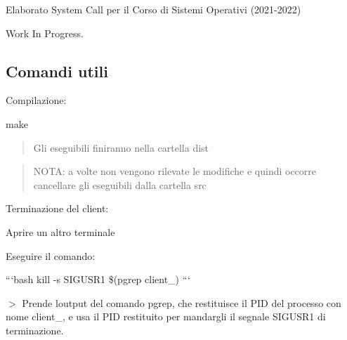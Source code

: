 Elaborato System Call per il Corso di Sistemi Operativi (2021-\/2022) 



Work In Progress.

\subsection*{Comandi utili}

Compilazione\+: 
\begin{DoxyCode}
make
\end{DoxyCode}
 \begin{quote}
Gli eseguibili finiranno nella cartella {\ttfamily dist} \end{quote}


\begin{quote}
N\+O\+TA\+: a volte non vengono rilevate le modifiche e quindi occorre cancellare gli eseguibili dalla cartella src \end{quote}


Terminazione del client\+:
\begin{DoxyEnumerate}
\item Aprire un altro terminale
\item Eseguire il comando\+:

```bash kill -\/s S\+I\+G\+U\+S\+R1 \$(pgrep client\+\_) ```

$>$ Prende l\textquotesingle{}output del comando pgrep, che restituisce il P\+ID del processo con nome client\+\_, e usa il P\+ID restituito per mandargli il segnale S\+I\+G\+U\+S\+R1 di terminazione. 
\end{DoxyEnumerate}